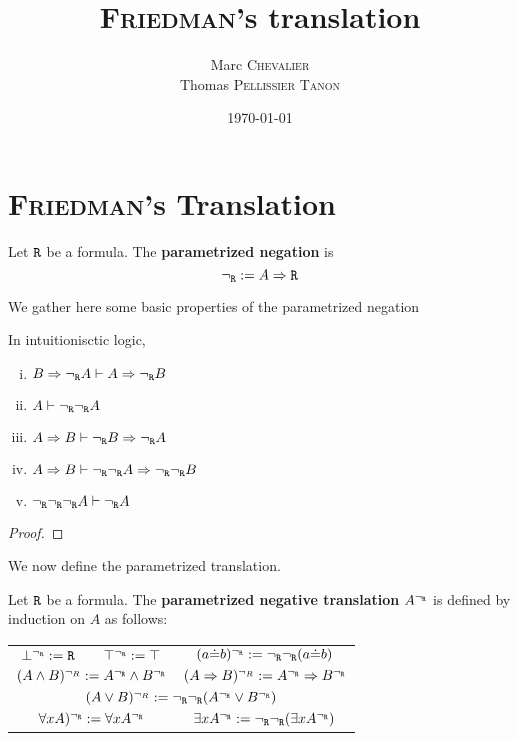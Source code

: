 

\author{
    Marc \textsc{Chevalier}\\
    Thomas \textsc{Pellissier} \textsc{Tanon}}
\date{\today}
\title{\textsc{Friedman}'s translation}



\maketitle

\section{\textsc{Friedman}'s Translation}

\begin{definition}
    Let $\texttt{R}$ be a formula. The \textbf{parametrized negation} is 
    $$
        \neg_{\texttt{R}} := A \Rightarrow \texttt{R}
    $$
\end{definition}

We gather here some basic properties of the parametrized negation

\begin{proposition}
    In intuitionisctic logic,
    \begin{enumerate}[(i)]
        \item $B \Rightarrow \neg_{\texttt{R}} A \vdash A \Rightarrow \neg_{\texttt{R}} B$
        \item $A\vdash \neg_{\texttt{R}}\neg_{\texttt{R}} A$
        \item $A\Rightarrow B \vdash \neg_{\texttt{R}} B \Rightarrow \neg_{\texttt{R}} A$
        \item $A\Rightarrow B \vdash \neg_{\texttt{R}}\neg_{\texttt{R}} A \Rightarrow \neg_{\texttt{R}} \neg_{\texttt{R}} B$
        \item $\neg_{\texttt{R}} \neg_{\texttt{R}} \neg_{\texttt{R}} A \vdash \neg_{\texttt{R}} A$
    \end{enumerate}
\end{proposition}
\begin{proof}
    
\end{proof}

We now define the parametrized translation.
\begin{definition}
    Let $\texttt{R}$ be a formula. The \textbf{parametrized negative translation} $A^{\neg_{\texttt{R}}}$ is defined by induction on $A$ as follows:
    \begin{center}
    \begin{tabular}{cccc}
        $\bot^{\neg_{\texttt{R}}} := \texttt{R}$ & $\top^{\neg_{\texttt{R}}} := \top$ & \multicolumn{2}{c}{$(a\dot{=}b)^{\neg_{\texttt{R}}} := \neg_{\texttt{R}}\neg_{\texttt{R}}(a\dot{=}b)$}\\
        \multicolumn{2}{c}{$(A\wedge B)^{\neg_R}:=A^{\neg_{\texttt{R}}} \wedge B^{\neg_{\texttt{R}}}$} & \multicolumn{2}{c}{$(A \Rightarrow B)^{\neg_R}:=A^{\neg_{\texttt{R}}} \Rightarrow B^{\neg_{\texttt{R}}}$}\\
        \multicolumn{4}{c}{$(A \vee B)^{\neg_R}:=\neg_{\texttt{R}}\neg_{\texttt{R}}(A^{\neg_{\texttt{R}}} \vee B^{\neg_{\texttt{R}}})$}\\
        \multicolumn{2}{c}{$\forall x A)^{\neg_{\texttt{R}}} := \forall x A^{\neg_{\texttt{R}}}$} & \multicolumn{2}{c}{$\exists x A^{\neg_{\texttt{R}}} := \neg_{\texttt{R}}\neg_{\texttt{R}}(\exists x A^{\neg_{\texttt{R}}})$}
    \end{tabular}
    \end{center}
\end{definition}

